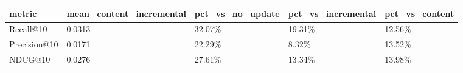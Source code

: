 \begin{tabular}{lllll}
\toprule
metric & mean_content_incremental & pct_vs_no_update & pct_vs_incremental & pct_vs_content \\
\midrule
Recall@10 & 0.0313 & 32.07\% & 19.31\% & 12.56\% \\
Precision@10 & 0.0171 & 22.29\% & 8.32\% & 13.52\% \\
NDCG@10 & 0.0276 & 27.61\% & 13.34\% & 13.98\% \\
\bottomrule
\end{tabular}
